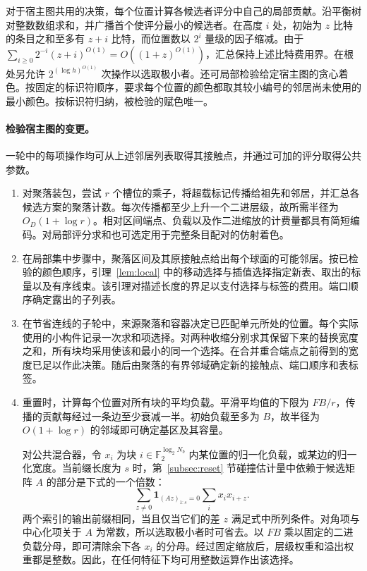 对于宿主图共用的决策，每个位置计算各候选者评分中自己的局部贡献。沿平衡树对整数数组求和，并广播首个使评分最小的候选者。在高度 $i$ 处，初始为 $z$ 比特的条目之和至多有 $z+i$ 比特，而位置数以 $2^i$ 量级的因子缩减。由于 $\sum_{i\ge0}2^{-i}(z+i)^{O(1)}=O((1+z)^{O(1)})$，汇总保持上述比特费用界。在根处另允许 $2^{(\log h)^{O(1)}}$ 次操作以选取极小者。还可局部检验给定宿主图的贪心着色。按固定的标识符顺序，要求每个位置的颜色都取其较小编号的邻居尚未使用的最小颜色。按标识符归纳，被检验的赋色唯一。

\paragraph{检验宿主图的变更。}
一轮中的每项操作均可从上述邻居列表取得其接触点，并通过可加的评分取得公共参数。
\begin{enumerate}
\item 对聚落装包，尝试 $r$ 个槽位的乘子，将超载标记传播给祖先和邻居，并汇总各候选方案的聚落计数。每次传播都至少上升一个二进层级，故所需半径为 $O_D(1+\log r)$。相对区间端点、负载以及作二进缩放的计费量都具有简短编码。对局部评分求和也可选定用于完整条目配对的仿射着色。
\item 在局部集中步骤中，聚落区间及其原接触点给出每个球面的可能邻居。按已检验的颜色顺序，引理~\ref{lem:local} 中的移动选择与插值选择指定新表、取出的标量以及有序线束。该引理对描述长度的界足以支付选择与标签的费用。端口顺序确定露出的子列表。
\item 在节省连线的子轮中，来源聚落和容器决定已匹配单元所处的位置。每个实际使用的小构件记录一次求和项选择。对两种收缩分别求其保留下来的替换宽度之和，所有块均采用使该和最小的同一个选择。在合并重合端点之前得到的宽度已足以作此决策。随后由聚落的有界邻域确定新的接触点、端口顺序和表标签。
\item 重置时，计算每个位置对所有块的平均负载。平滑平均值的下限为 $FB/r$，传播的贡献每经过一条边至少衰减一半。初始负载至多为 $B$，故半径为 $O(1+\log r)$ 的邻域即可确定基区及其容量。

对公共混合器，令 $x_i$ 为块 $i\in\mathbb F_2^{\log_2 N_b}$ 内某位置的归一化负载，或某边的归一化宽度。当前缀长度为 $s$ 时，第~\ref{subsec:reset} 节碰撞估计量中依赖于候选矩阵 $A$ 的部分是下式的一个倍数：
\[
 \sum_{z\ne0}\boldsymbol{1}_{(Az)_{1:s}=0}
                     \sum_i x_i x_{i+z}.
\]
两个索引的输出前缀相同，当且仅当它们的差 $z$ 满足式中所列条件。对角项与中心化项关于 $A$ 为常数，所以选取极小者时可省去。以 $FB$ 乘以固定的二进负载分母，即可清除余下各 $x_i$ 的分母。经过固定缩放后，层级权重和溢出权重都是整数。因此，在任何特征下均可用整数运算作出该选择。


\end{enumerate}
